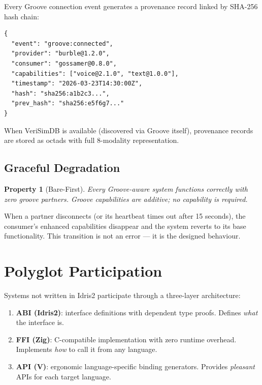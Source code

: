 \documentclass[11pt,a4paper]{article}
\newtheorem{property}{Property}
\begin{document}
Every Groove connection event generates a provenance record linked by
SHA-256 hash chain:

\begin{lstlisting}[caption={Provenance record structure}]
{
  "event": "groove:connected",
  "provider": "burble@1.2.0",
  "consumer": "gossamer@0.8.0",
  "capabilities": ["voice@2.1.0", "text@1.0.0"],
  "timestamp": "2026-03-23T14:30:00Z",
  "hash": "sha256:a1b2c3...",
  "prev_hash": "sha256:e5f6g7..."
}
\end{lstlisting}

When VeriSimDB is available (discovered via Groove itself), provenance
records are stored as octads with full 8-modality representation.

\subsection{Graceful Degradation}

\begin{property}[Bare-First]
Every Groove-aware system functions correctly with zero groove partners.
Groove capabilities are additive; no capability is required.
\end{property}

When a partner disconnects (or its heartbeat times out after 15 seconds),
the consumer's enhanced capabilities disappear and the system reverts to
its base functionality. This transition is not an error --- it is the
designed behaviour.

\section{Polyglot Participation}
\label{sec:polyglot}

Systems not written in Idris2 participate through a three-layer
architecture:

\begin{enumerate}
\item \textbf{ABI (Idris2)}: interface definitions with dependent type
  proofs. Defines \emph{what} the interface is.
\item \textbf{FFI (Zig)}: C-compatible implementation with zero runtime
  overhead. Implements \emph{how} to call it from any language.
\item \textbf{API (V)}: ergonomic language-specific binding generators.
  Provides \emph{pleasant} APIs for each target language.
\end{enumerate}
\end{document}
